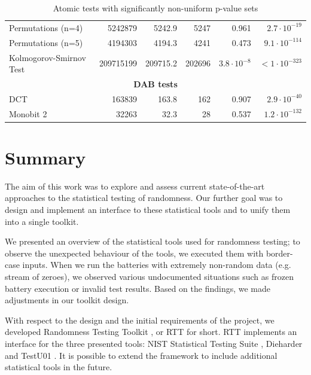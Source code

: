 \documentclass[
	digital,    %
	oneside,
	color,
	11pt,
	nocover,
	notable,
	nolof,
	nolot,
]{fithesis3}
\newcommand{\rd}{\cellcolor{red!40}}
\theoremstyle{definition}
\theoremstyle{remark}
\begin{document}
\begin{table}[H]
\begin{nomar}
{\begin{tabular}{@{}lrrrrr@{}}
Permutations (n=4)             & 5242879           & 5242.9        & 5247          & 0.961                  & $2.7 \cdot 10^{-19}$  \rd \\
Permutations (n=5)             & 4194303           & 4194.3        & 4241          & 0.473                  & $9.1 \cdot 10^{-114}$ \rd \\
Kolmogorov-Smirnov Test        & 209715199         & 209715.2      & 202696        & $3.8\cdot 10^{-8}$ \rd & $<1\cdot 10^{-323}$   \rd \\ \midrule
\multicolumn{6}{c}{\textbf{DAB tests}} \\ \midrule
DCT                            & 163839            & 163.8         & 162           & 0.907                  & $2.9 \cdot 10^{-40}$  \rd \\
Monobit 2                      & 32263             & 32.3          & 28            & 0.537                  & $1.2 \cdot 10^{-132}$ \rd \\ \bottomrule
\end{tabular}
}
\end{nomar}
\caption{Atomic tests with significantly non-uniform p-value sets}
\label{tab:non_uniform_atomic_tests}
\end{table}

\chapter{Summary}
\label{chap:summary}
The aim of this work was to explore and assess current state-of-the-art approaches to the statistical testing of randomness. Our further goal was to design and implement an interface to these statistical tools and to unify them into a single toolkit.

We presented an overview of the statistical tools used for randomness testing; to observe the unexpected behaviour of the tools, we executed them with border-case inputs. When we run the batteries with extremely non-random data (e.g. stream of zeroes), we observed various undocumented situations such as frozen battery execution or invalid test results. Based on the findings, we made adjustments in our toolkit design. 

With respect to the design and the initial requirements of the project, we developed Randomness Testing Toolkit \cite{rtt-github}, or RTT for short. RTT implements an interface for the three presented tools: NIST Statistical Testing Suite \cite{nist-sts}, Dieharder \cite{dieharder} and TestU01 \cite{testu01-paper}. It is possible to extend the framework to include additional statistical tools in the future.
\end{document}
